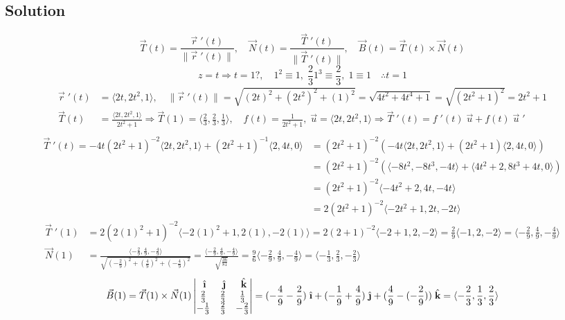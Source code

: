 \documentclass{article}
\newcommand{\ihat}{\;\hat{\textbf{\i}}}
\newcommand{\jhat}{\;\hat{\textbf{\j}}}
\newcommand{\khat}{\;\hat{\textbf{k}}}
\newcommand{\drvec}{\vec{r}\;'(t)}
\newcommand\vv[1]{\langle #1 \rangle}
\newcommand\vc[2]{\vec{#1}(#2)}
\newcommand\vcd[2]{\vec{#1}\;'(#2)}
\newcommand\mgv[1]{\|#1\|}
\newcommand\mgvvv[3]{\sqrt{\left(#1\right)^2 + \left(#2\right)^2 + \left(#3\right)^2}}
\begin{document}
\subsection*{Solution}
\[
    \vc T t = \frac{\drvec}{\|\drvec\|}, \quad \vc N t = \frac{\vec T\;'(t)}{\|\vec T\;'(t)\|}, \quad \vc B t = \vc T t \times \vc N t
\]
\[
    z = t \Rightarrow t = 1?, \quad 1^2 \equiv 1,\; \frac 2 3 1^3 \equiv \frac 2 3,\; 1 \equiv 1 \quad \therefore t= 1
\]
\begin{align*}
    \vcd r t &= \vv{2t, 2t^2, 1}, \quad \mgv{\vcd r t} = \mgvvv{2t}{2t^2}{1} = \sqrt{4t^2 + 4t^4 + 1} = \sqrt{(2t^2 + 1)^2} = 2t^2 + 1 \\
    \vc T t &= \frac{\vv{2t, 2t^2, 1}}{2t^2+1} \Rightarrow \vc T 1 = \vv{\frac 2 3, \frac 2 3, \frac 1 3}, \quad f(t) = \frac{1}{2t^2 + 1}, \; \vec u = \vv{2t, 2t^2, 1} \Rightarrow \vcd T t = f\;'(t)\;\vec u + f(t)\;\vec u\;' \\
\end{align*}
\begin{align*}
    \vcd T t = -4t(2t^2+1)^{-2}\vv{2t,2t^2,1} + (2t^2+1)^{-1}\vv{2,4t,0} &= (2t^2+1)^{-2}(-4t\vv{2t, 2t^2, 1}+(2t^2+1)\vv{2,4t,0}) \\
             &= (2t^2+1)^{-2}(\vv{-8t^2,-8t^3,-4t}+\vv{4t^2+2,8t^3+4t,0}) \\
             &= (2t^2 + 1)^{-2}\vv{-4t^2 + 2, 4t, -4t} \\
             &= 2(2t^2+1)^{-2}\vv{-2t^2+1, 2t, -2t} 
\end{align*}
\begin{align*}
    \vcd T 1 &= 2(2(1)^2+1)^{-2}\vv{-2(1)^2+1, 2(1), -2(1)} = 2(2+1)^{-2}\vv{-2+1, 2, -2} = \frac 2 9 \vv{-1, 2, -2} = \vv{-\frac{2}{9}, \frac 4 9, -\frac 4 9} \\
    \vc N 1 &= \frac{\vv{-\frac 2 9, \frac 4 9, -\frac 4 9 }}{\mgvvv{-\frac 2 9}{\frac 4 9}{-\frac 4 9}} = \frac{\vv{-\frac 2 9, \frac 4 9, -\frac 4 9 }}{\sqrt{\frac{36}{81}}} = \frac 9 6\vv{-\frac 2 9, \frac 4 9, -\frac 4 9} = \vv{-\frac 1 3, \frac 2 3, -\frac 2 3}
\end{align*}
\begin{align*}
    \vc B 1 = \vc T 1 \times \vc N 1 
    \begin{vmatrix}
        \ihat & \jhat & \khat \\ 
        \frac 2 3 & \frac 2 3 & \frac 1 3 \\ 
        -\frac 1 3 & \frac 2 3 & -\frac 2 3
    \end{vmatrix} = (-\frac 4 9 - \frac 2 9)\ihat + (-\frac 1 9 + \frac 4 9)\jhat + (\frac 4 9 - (-\frac 2 9))\khat = \vv{-\frac 2 3, \frac 1 3, \frac 2 3}
\end{align*}
\end{document}
